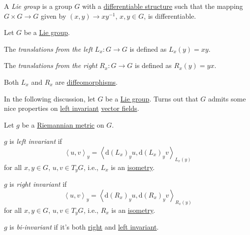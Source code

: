 \begin{definition}\label{def:Lie-group}
	A \emph{Lie group} is a group \(G\) with a \hyperref[def:smooth-structure]{differentiable structure} such that the mapping \(G \times G \to G\) given by \((x, y) \to xy^{-1} \), \(x, y\in G\), is differentiable.
\end{definition}

\begin{definition*}[Transformation]
	Let \(G\) be a \hyperref[def:Lie-group]{Lie group}.
	\begin{definition}\label{def:left-transformation}
		The \emph{translations from the left} \(L_x \colon G \to G\) is defined as \(L_x(y) = xy\).
	\end{definition}
	\begin{definition}\label{def:right-transformation}
		The \emph{translations from the right} \(R_x \colon G \to G\) is defined as \(R_x(y) = yx\).
	\end{definition}
\end{definition*}

\begin{remark}
	Both \(L_x\) and \(R_x\) are \hyperref[def:diffeomorphism]{diffeomorphisms}.
\end{remark}

In the following discussion, let \(G\) be a \hyperref[def:Lie-group]{Lie group}. Turns out that \(G\) admits some nice properties on \hyperref[def:vector-field-left-invariant]{left invariant} \hyperref[def:vector-field]{vector fields}.

\begin{definition*}
	Let \(g\) be a \hyperref[def:Riemannian-metric]{Riemannian metric} on \(G\).

	\begin{definition}\label{def:Riemannian-metric-left-invariant}
		\(g\) is \emph{left invariant} if
		\[
			\left\langle u, v \right\rangle _y = \left\langle \mathrm{d} ( L_x ) _y u, \mathrm{d} (L_x)_y v \right\rangle _{L_x(y)}
		\]
		for all \(x, y\in G\), \(u, v\in T_y G\), i.e., \(L_x\) is an \hyperref[def:isometry]{isometry}.
	\end{definition}

	\begin{definition}\label{def:Riemannian-metric-right-invariant}
		\(g\) is \emph{right invariant} if
		\[
			\left\langle u, v \right\rangle _y = \left\langle \mathrm{d} (R_x)_y u, \mathrm{d} (R_x)_y v \right\rangle _{R_x(y)}
		\]
		for all \(x, y\in G\), \(u, v\in T_y G\), i.e., \(R_x\) is an \hyperref[def:isometry]{isometry}.
	\end{definition}

	\begin{definition}[Bi-invariant]\label{def:Riemannian-metric-bi-invariant}
		\(g\) is \emph{bi-invariant} if it's both \hyperref[def:Riemannian-metric-right-invariant]{right} and \hyperref[def:Riemannian-metric-left-invariant]{left invariant}.
	\end{definition}
\end{definition*}

